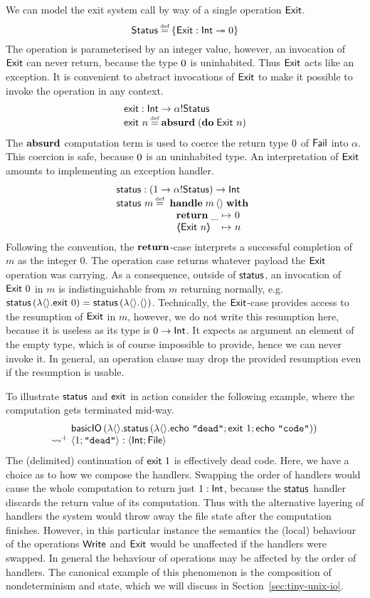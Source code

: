 \documentclass[12pt,phd,lfcs,twoside,openright,logo,leftchapter,normalheadings]{infthesis}
\theoremstyle{plain}
\theoremstyle{definition}
\begin{document}
We can model the exit system call by way of a single operation
$\mathsf{Exit}$.
%
\[
  \Status \defas \{\Exit : \Int \opto \ZeroType\}
\]
%
The operation is parameterised by an integer value, however, an
invocation of $\mathsf{Exit}$ can never return, because the type $0$ is
uninhabited. Thus $\mathsf{Exit}$ acts like an exception.
%
It is convenient to abstract invocations of $\mathsf{Exit}$ to make it
possible to invoke the operation in any context.
%
\[
  \bl
    \exit : \Int \to \alpha \eff \Status\\
    \exit~n \defas \Absurd\;(\Do\;\Exit~n)
  \el
\]
%
The $\mathbf{absurd}$ computation term is used to coerce the return type
$0$ of $\mathsf{Fail}$ into $\alpha$. This coercion is safe, because
$0$ is an uninhabited type.
%
An interpretation of $\mathsf{Exit}$ amounts to implementing an exception
handler.
%
\[
  \bl
    \status : (\UnitType \to \alpha \eff \Status) \to \Int\\
    \status~m \defas
       \ba[t]{@{~}l}
         \Handle\;m\,\Unit\;\With\\
           ~\ba{@{~}l@{~}c@{~}l}
              \Return\;\_ &\mapsto& 0\\
              \ExnCase{\Exit}{n} &\mapsto& n
           \ea
       \ea
  \el
\]
%
Following the \UNIX{} convention, the $\mathbf{return}$-case interprets a
successful completion of $m$ as the integer $0$. The operation case
returns whatever payload the $\mathsf{Exit}$ operation was carrying. As a
consequence, outside of $\mathsf{status}$, an invocation of $\mathsf{Exit}~0$ in $m$
is indistinguishable from $m$ returning normally, e.g.
$\mathsf{status}\,(\lambda\langle  \rangle.\mathsf{exit}~0) = \mathsf{status}\,(\lambda\langle  \rangle.\langle  \rangle)$.
%
Technically, the $\mathsf{Exit}$-case provides access to the resumption of
$\mathsf{Exit}$ in $m$, however, we do not write this resumption here, because
it is useless as its type is $0 \to \mathsf{Int}$. It expects as
argument an element of the empty type, which is of course impossible
to provide, hence we can never invoke it. In general, an operation
clause may drop the provided resumption even if the resumption is
usable.

To illustrate $\mathsf{status}$ and $\mathsf{exit}$ in action consider the following
example, where the computation gets terminated mid-way.
%
\[
  \ba{@{~}l@{~}l}
    &\bl
      \basicIO\,(\lambda\Unit.
         \status\,(\lambda\Unit.
            \echo~\strlit{dead};\exit~1;\echo~\strlit{code}))
     \el\\
    \reducesto^+& \Record{1;\strlit{dead}} : \Record{\Int;\UFile}
  \ea
\]
%
The (delimited) continuation of $\mathsf{exit}~1$ is effectively dead code.
%
Here, we have a choice as to how we compose the handlers. Swapping the
order of handlers would cause the whole computation to return just
$1 : \mathsf{Int}$, because the $\mathsf{status}$ handler discards the return value of
its computation. Thus with the alternative layering of handlers the
system would throw away the file state after the computation
finishes. However, in this particular instance the semantics the
(local) behaviour of the operations $\mathsf{Write}$ and $\mathsf{Exit}$ would be
unaffected if the handlers were swapped. In general the behaviour of
operations may be affected by the order of handlers. The canonical
example of this phenomenon is the composition of nondeterminism and
state, which we will discuss in Section~\ref{sec:tiny-unix-io}.
\end{document}
